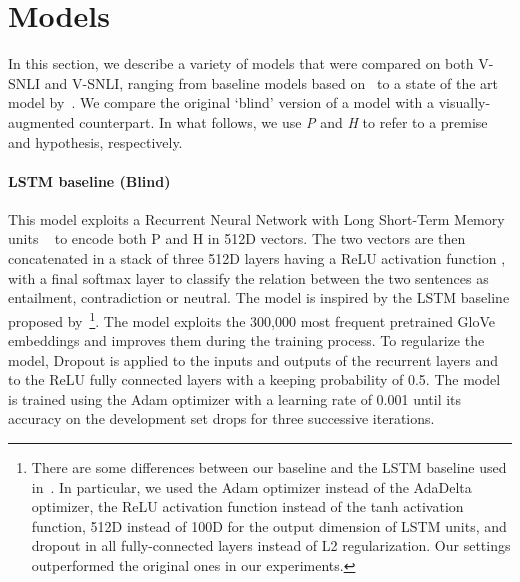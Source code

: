 \documentclass[11pt]{article}
\begin{document}
 \section{Models}
\label{sec:models}
 
In this section, we describe a variety of models that were compared on both V-SNLI and V-SNLI, ranging from baseline models based on~ to a state of the art model by~. We compare the original `blind' version of a model with a visually-augmented counterpart.
In what follows, we use {\em P} and {\em H} to refer to a premise and hypothesis, respectively.

\paragraph{LSTM baseline (Blind)} This model exploits a Recurrent Neural Network with Long Short-Term Memory units ~\cite{hochreiter1997:lstm} to encode both P and H in 512D vectors. The two vectors are then concatenated in a stack of three 512D layers having a ReLU activation function \cite{nair2010:relu}, with a final softmax layer to classify the relation between the two sentences as entailment, contradiction or neutral. The model is inspired by the LSTM baseline proposed by~\footnote{There are some differences between our baseline and the LSTM baseline used in~\cite{snli:emnlp2015}. In particular, we used the Adam optimizer instead of the AdaDelta optimizer, the ReLU activation function instead of the tanh activation function, 512D instead of 100D for the output dimension of LSTM units, and dropout in all fully-connected layers instead of L2 regularization. Our settings outperformed the original ones in our experiments.}.
The model exploits the 300,000 most frequent pretrained GloVe embeddings \cite{Pennington2014} and improves them during the training process. To regularize the model, Dropout \cite{srivastava2014:dropout} is applied to the inputs and outputs of the recurrent layers and to the ReLU fully connected layers with a keeping probability of 0.5. The model is trained using the Adam
optimizer \cite{kingma2014:adam} with a learning rate of 0.001 until its accuracy on the
development set drops for three successive iterations.
\end{document}
